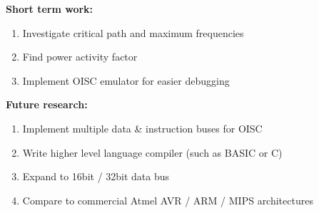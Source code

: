 \documentclass[portrait,color=UCLmidgreen,margin=1.5cm,bannerheight=8cm,logoheight=2.5cm]{uclposter}
\begin{document}
\begin{Row}
\begin{Cell}{2}
\begin{tcolorbox}[title=Future work]
\begin{multicols}{2}
		\textbf{Short term work:}
		\begin{enumerate}
			\item Investigate critical path and maximum frequencies
			\item Find power activity factor
			\item Implement OISC emulator for easier debugging
		\end{enumerate}
		\columnbreak
		\textbf{Future research:}
		\begin{enumerate}
			\item Implement multiple data \& instruction buses for OISC
			\item Write higher level language compiler (such as BASIC or C)
			\item Expand to 16bit / 32bit data bus
			\item Compare to commercial Atmel AVR / ARM / MIPS  architectures
		\end{enumerate}
	\end{multicols}

\end{tcolorbox}
\end{Cell}\end{Row}
\end{document}
